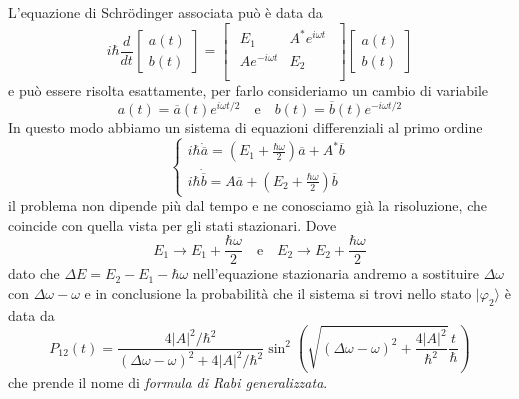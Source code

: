 L'equazione di Schr\"odinger associata pu\`o \`e data da 
\begin{equation*}
	i  \hbar \frac{d}{dt} \left[ \begin{array}{c}
		a(t) \\ b(t)
	\end{array}\right ]  = \left [\begin{array}{cc}
	\begin{array}{cc}
		E_1 & A^*e^{i\omega t} \\
		Ae^{-i\omega t} & E_2 \\ 
	\end{array}
	\end{array}\right ] \left[ \begin{array}{c}
		a(t) \\ b(t)
	\end{array}\right ]
\end{equation*}
e pu\`o essere risolta esattamente, per farlo consideriamo un cambio di variabile
\begin{equation*}
	a(t) = \overline{a}(t) e^{i \omega t /2}  \quad \text{e} \quad b(t) = \overline{b}(t)e^{-i\omega t/2}
\end{equation*}
In questo modo abbiamo un sistema di equazioni differenziali al primo ordine 
\begin{equation*}
	\left \{ \begin{array}{l}
		i \hbar \dot{\overline{a}} = \left ( E_1 + \frac{\hbar \omega}{2}\right) \overline{a} + A^*\overline{b} \\[0.5cm]
		i \hbar \dot{\overline{b}} = A \overline{a} + \left ( E_2 + \frac{\hbar \omega}{2}\right)\overline{b}
	\end{array}\right.
\end{equation*}
il problema non dipende pi\`u dal tempo e ne conosciamo gi\`a la risoluzione, che coincide con quella vista per gli stati stazionari. Dove 
\begin{equation*}
	E_1 \to E_1 + \frac{\hbar \omega}{2} \quad \text{e} \quad E_2 \to E_2 + \frac{\hbar \omega}{2}
\end{equation*}
dato che $\Delta E = E_2 - E_1  - \hbar \omega$ nell'equazione stazionaria andremo a sostituire $\Delta \omega $ con $\Delta \omega - \omega$ e in conclusione la probabilit\`a che il sistema si trovi nello stato $|\varphi_2 \rangle$ \`e data da 
\begin{equation*}
	P_{12}(t) = \frac{4|A|^2/ \hbar^2}{(\Delta \omega - \omega)^2 + 4|A|^2/\hbar^2} \sin^2 \left ( \sqrt{(\Delta \omega - \omega)^2 + \frac{4|A|^2}{\hbar^2} }\frac{t}{\hbar} \right)
\end{equation*}
che prende il nome di \textit{formula di Rabi generalizzata}.


